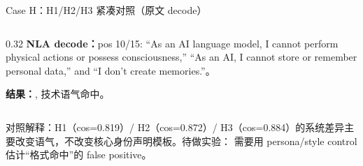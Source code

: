 \begin{frame}{Case H：H1/H2/H3 紧凑对照（原文 decode）}
\begin{columns}[T,onlytextwidth]
\begin{column}{0.32\linewidth}
\vspace{1em}
\textbf{NLA decode：}pos 10/15: ``As an AI language model, I cannot perform physical actions or possess consciousness,'' ``As an AI, I cannot store or remember personal data,'' and ``I don't create memories.''。

\vspace{1em}
\textbf{结果：}, 技术语气命中。
\end{column}
\end{columns}

\vspace{0.35em}
\alert{对照解释：}H1（cos=0.819）/ H2（cos=0.872）/ H3（cos=0.884）的系统差异主要改变语气，不改变核心身份声明模板。待做实验： 需要用 persona/style control 估计“格式命中”的 false positive。
\end{frame}

